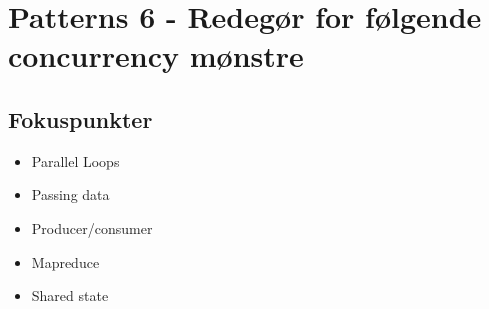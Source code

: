 \section{Patterns 6 - Redegør for følgende concurrency mønstre}

\subsection{Fokuspunkter}

\begin{itemize}
	\item Parallel Loops
	\item Passing data
	\item Producer/consumer
	\item Mapreduce
	\item Shared state
\end{itemize}